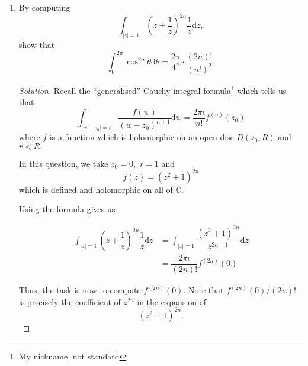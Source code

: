\documentclass[12pt]{article}
\theoremstyle{definition}
\numberwithin{thm}{section}
\newenvironment{soln}{\begin{proof}[Solution]}{\end{proof}}
\begin{document}
\begin{enumerate}
\begin{soln}
\begin{enumerate}
		Thus, we get
		\begin{align*} 
			\left|\int_{0}^{1} (1 - t)^{2N + 2}\cos^{(2N+2)}(tz){\mathrm{d}}t\right| &\le \int_{0}^{1} (1 - t)^N\left|\cos^{(2N+2)}(tz)\right|{\mathrm{d}}t\\
			&\le \int_{0}^{1} (1 - t)^{2N + 2} \cosh R {\mathrm{d}}t\\
			&= \dfrac{\cosh R}{2N + 3}.
		\end{align*}
		As earlier, the desired result follows. \qedhere
		\end{enumerate}
	\end{soln}
	\item By computing
	\begin{equation*} 
		\int_{|z| = 1}^{} \left(z + \dfrac{1}{z}\right)^{2n}\dfrac{1}{z} {\mathrm{d}}z,
	\end{equation*}
	show that
	\begin{equation*} 
		\int_{0}^{2\pi} \cos^{2n}\theta {\mathrm{d}}\theta = \dfrac{2\pi}{4^n}\cdot\dfrac{(2n)!}{(n!)^2}.
	\end{equation*}
	\begin{soln}
		Recall the ``generalised'' Cauchy integral formula\footnote{My nickname, not standard} which tells us that
		\begin{equation*} 
			\int_{|w - z_0| = r}^{} \dfrac{f(w)}{(w - z_0)^{n+1}} {\mathrm{d}}w = \dfrac{2\pi\iota}{n!}f^{(n)}(z_0)
		\end{equation*}
		where $f$ is a function which is holomorphic on an open disc $D(z_0, R)$ and $r < R.$

		In this question, we take $z_0 = 0,$ $r = 1$ and
		\begin{equation*} 
			f(z) = (z^2 + 1)^{2n}
		\end{equation*}
		which is defined and holomorphic on all of $\mathbb{C}.$

		Using the formula gives us

		\begin{align*} 
			\int_{|z| = 1}^{} \left(z + \dfrac{1}{z}\right)^{2n}\dfrac{1}{z} {\mathrm{d}}z &= \int_{|z| = 1}^{} \dfrac{(z^2 + 1)^{2n}}{z^{2n + 1}} {\mathrm{d}}z\\
			&= \dfrac{2\pi\iota}{(2n)!}f^{(2n)}(0)
		\end{align*}

		Thus, the task is now to compute $f^{(2n)}(0).$ Note that $f^{(2n)}(0)/(2n)!$ is precisely the coefficient of $z^{2n}$ in the expansion of 
		\begin{equation*} 
			(z^2 + 1)^{2n}.
		\end{equation*}


\end{soln}
\end{enumerate}
\end{document}
